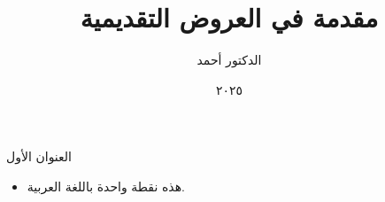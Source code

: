 \documentclass{beamer}
\title{مقدمة في العروض التقديمية}
\author{الدكتور أحمد}
\institute{جامعة المثال}
\date{٢٠٢٥}
\begin{document}
\begin{frame}
  \titlepage
\end{frame}

\begin{frame}{العنوان الأول}
  \begin{itemize}
    \item هذه نقطة واحدة باللغة العربية.
  \end{itemize}
\end{frame}
\end{document}
